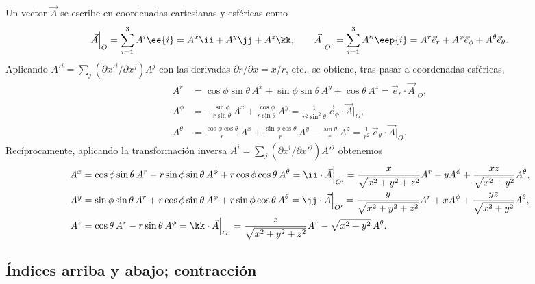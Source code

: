 Un vector $\vec A$ se escribe en coordenadas cartesianas y esféricas como
\begin{equation}
\vec A\Big|_O = \sum_{i=1}^3 A^i\ee{i} = A^x\ii + A^y\jj + A^z\kk, \qquad
\vec A\Big|_{O'} = \sum_{i=1}^3 A'^i\eep{i} = A^r\vec e_r + A^\phi\vec e_\phi + A^\theta\vec e_\theta .
\end{equation}
Aplicando $A'^i=\sum_j(\partial x'^i/\partial x^j)A^j$ con las derivadas $\partial r/\partial x=x/r$, etc., se obtiene, tras pasar a coordenadas esféricas,
\begin{align}
A^r &= \cos\phi\sin\theta\, A^x + \sin\phi\sin\theta\, A^y + \cos\theta\, A^z = \vec e_r\cdot\vec A\Big|_O, \\
A^\phi &= -\frac{\sin\phi}{r\sin\theta}\, A^x + \frac{\cos\phi}{r\sin\theta}\, A^y = \frac{1}{r^2\sin^2\theta}\,\vec e_\phi\cdot\vec A\Big|_O, \\
A^\theta &= \frac{\cos\phi\cos\theta}{r}\, A^x + \frac{\sin\phi\cos\theta}{r}\, A^y - \frac{\sin\theta}{r}\, A^z = \frac{1}{r^2}\,\vec e_\theta\cdot\vec A\Big|_O .
\end{align}
Recíprocamente, aplicando la transformación inversa $A^i=\sum_j (\partial x^i/\partial x'^j)A'^j$ obtenemos
\begin{align}
A^x &= \cos\phi\sin\theta\, A^r - r\sin\phi\sin\theta\, A^\phi + r\cos\phi\cos\theta\, A^\theta
= \ii\cdot \vec A\Big|_{O'}
= \frac{x}{\sqrt{x^2+y^2+z^2}}A^r - y A^\phi + \frac{xz}{\sqrt{x^2+y^2}}A^\theta, \\
A^y &= \sin\phi\sin\theta\, A^r + r\cos\phi\sin\theta\, A^\phi + r\sin\phi\cos\theta\, A^\theta
= \jj\cdot \vec A\Big|_{O'}
= \frac{y}{\sqrt{x^2+y^2+z^2}}A^r + x A^\phi + \frac{yz}{\sqrt{x^2+y^2}}A^\theta, \\
A^z &= \cos\theta\, A^r - r\sin\theta\, A^\phi
= \kk\cdot \vec A\Big|_{O'}
= \frac{z}{\sqrt{x^2+y^2+z^2}}A^r - \sqrt{x^2+y^2}\,A^\theta .
\end{align}

\subsection{Índices arriba y abajo; contracción}

